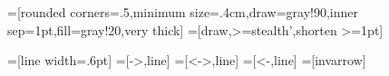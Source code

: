 \usepackage{xspace}
\usetikzlibrary{arrows}
\usetikzlibrary{automata}
\usetikzlibrary{shapes,snakes}
\usetikzlibrary{calc}
\usetikzlibrary{patterns}
\usetikzlibrary{shapes.geometric}
\usetikzlibrary{positioning}
=[rounded corners=.5,minimum size=.4cm,draw=gray!90,inner sep=1pt,fill=gray!20,very thick]
=[draw,>=stealth',shorten >=1pt]


\tikzset{>=latex,bend angle=20}
=[line width=.6pt]
=[->,line]
=[<->,line]
=[<-,line]
=[invarrow]
 
